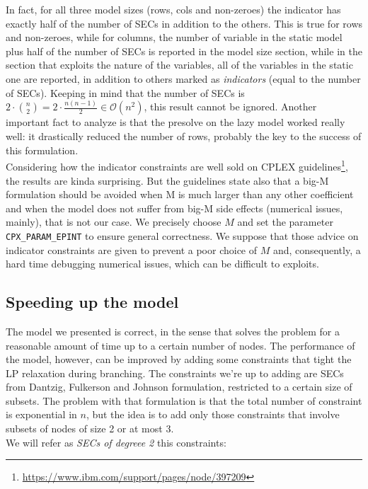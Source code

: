 In fact, for all three model sizes (rows, cols and non-zeroes) the indicator has
exactly half of the number of SECs in addition to the others. This is true for
rows and non-zeroes, while for columns, the number of variable in the static model
plus half of the number of SECs is reported in the model size section, while in
the section that exploits the nature of the variables, all of the variables in
the static one are reported, in addition to others marked as \emph{indicators}
(equal to the number of SECs). Keeping in mind that the number of SECs is $2 \cdot
{ n \choose 2} = 2 \cdot \frac{n (n - 1)}{2} \in \mathcal{O}(n^2)$, this result
cannot be ignored. Another important fact to analyze is that the presolve on the
lazy model worked really well: it drastically reduced the number of rows,
probably the key to the success of this formulation.\\

Considering how the indicator constraints are well sold on CPLEX
guidelines\footnote{\href{https://www.ibm.com/support/pages/node/397209}{https://www.ibm.com/support/pages/node/397209}},
the results are kinda surprising. But the guidelines state also that a big-M
formulation should be avoided when M is much larger than any other coefficient
and when the model does not suffer from big-M side effects (numerical issues,
mainly), that is not our case. We precisely choose $M$ and set the
parameter \texttt{CPX\_PARAM\_EPINT} to ensure general correctness. We suppose
that those advice on indicator constraints are given to prevent a poor choice
of $M$ and, consequently, a hard time debugging numerical issues, which can be
difficult to exploits.

\subsection{Speeding up the model}
The model we presented is correct, in the sense that solves the problem for a
reasonable amount of time up to a certain number of nodes. The performance of
the model, however, can be improved by adding some constraints that tight the LP
relaxation during branching. The constraints we're up to adding are SECs from
Dantzig, Fulkerson and Johnson formulation, restricted to a certain size of
subsets. The problem with that formulation is that the total number of
constraint is exponential in $n$, but the idea is to add only those constraints
that involve subsets of nodes of size 2 or at most 3.\\

We will refer as \emph{SECs of degreee 2} this constraints:


